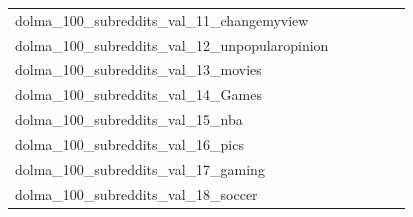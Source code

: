 \documentclass[dvipsnames]{article}
\begin{document}
\begin{appendix}
{\begin{longtable}{m{6cm}m{1.7cm}m{1.7cm}m{1.7cm}m{1.7cm}m{1.7cm}}
	dolma\_100\_subreddits\_val\_11\_changemyview  & \colorbox[HTML]{ffffe5}{\makebox[\mywidth][c]{20.02}} & \colorbox[HTML]{bbe395}{\makebox[\mywidth][c]{19.10}} & \colorbox[HTML]{ffffe5}{\makebox[\mywidth][c]{20.50}} & \colorbox[HTML]{d5eea1}{\makebox[\mywidth][c]{19.17}} & \colorbox[HTML]{77c578}{\makebox[\mywidth][c]{18.99}}\\
	dolma\_100\_subreddits\_val\_12\_unpopularopinion  & \colorbox[HTML]{ffffe5}{\makebox[\mywidth][c]{23.39}} & \colorbox[HTML]{bbe395}{\makebox[\mywidth][c]{22.16}} & \colorbox[HTML]{ffffe5}{\makebox[\mywidth][c]{23.63}} & \colorbox[HTML]{e7f5ad}{\makebox[\mywidth][c]{22.32}} & \colorbox[HTML]{77c578}{\makebox[\mywidth][c]{22.04}}\\
	dolma\_100\_subreddits\_val\_13\_movies  & \colorbox[HTML]{ffffe5}{\makebox[\mywidth][c]{21.62}} & \colorbox[HTML]{d1ec9f}{\makebox[\mywidth][c]{20.52}} & \colorbox[HTML]{ffffe5}{\makebox[\mywidth][c]{21.79}} & \colorbox[HTML]{eef8b2}{\makebox[\mywidth][c]{20.64}} & \colorbox[HTML]{77c578}{\makebox[\mywidth][c]{20.35}}\\
	dolma\_100\_subreddits\_val\_14\_Games  & \colorbox[HTML]{ffffe5}{\makebox[\mywidth][c]{22.26}} & \colorbox[HTML]{e5f4ab}{\makebox[\mywidth][c]{21.15}} & \colorbox[HTML]{ffffe5}{\makebox[\mywidth][c]{22.52}} & \colorbox[HTML]{eaf7af}{\makebox[\mywidth][c]{21.18}} & \colorbox[HTML]{77c578}{\makebox[\mywidth][c]{20.87}}\\
	dolma\_100\_subreddits\_val\_15\_nba  & \colorbox[HTML]{ffffe5}{\makebox[\mywidth][c]{23.28}} & \colorbox[HTML]{a7da8b}{\makebox[\mywidth][c]{21.93}} & \colorbox[HTML]{ffffe5}{\makebox[\mywidth][c]{23.60}} & \colorbox[HTML]{def2a6}{\makebox[\mywidth][c]{22.10}} & \colorbox[HTML]{77c578}{\makebox[\mywidth][c]{21.85}}\\
	dolma\_100\_subreddits\_val\_16\_pics  & \colorbox[HTML]{ffffe5}{\makebox[\mywidth][c]{21.84}} & \colorbox[HTML]{b4e091}{\makebox[\mywidth][c]{20.56}} & \colorbox[HTML]{ffffe5}{\makebox[\mywidth][c]{21.82}} & \colorbox[HTML]{d7efa2}{\makebox[\mywidth][c]{20.64}} & \colorbox[HTML]{77c578}{\makebox[\mywidth][c]{20.47}}\\
	dolma\_100\_subreddits\_val\_17\_gaming  & \colorbox[HTML]{ffffe5}{\makebox[\mywidth][c]{24.45}} & \colorbox[HTML]{e1f3a9}{\makebox[\mywidth][c]{23.13}} & \colorbox[HTML]{ffffe5}{\makebox[\mywidth][c]{24.61}} & \colorbox[HTML]{e3f4aa}{\makebox[\mywidth][c]{23.15}} & \colorbox[HTML]{77c578}{\makebox[\mywidth][c]{22.86}}\\
	dolma\_100\_subreddits\_val\_18\_soccer  & \colorbox[HTML]{ffffe5}{\makebox[\mywidth][c]{23.38}} & \colorbox[HTML]{aadc8d}{\makebox[\mywidth][c]{22.12}} & \colorbox[HTML]{ffffe5}{\makebox[\mywidth][c]{23.61}} & \colorbox[HTML]{c9e99b}{\makebox[\mywidth][c]{22.19}} & \colorbox[HTML]{77c578}{\makebox[\mywidth][c]{22.03}}\\

\end{longtable}}
\end{appendix}
\end{document}

